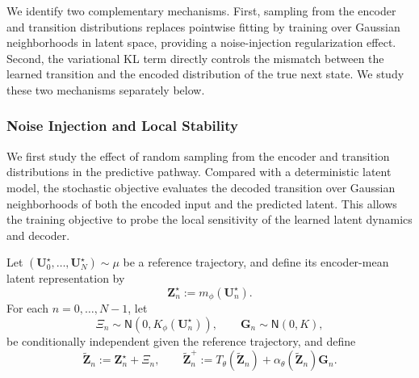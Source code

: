 \documentclass[11pt]{article}
\begin{document}
We identify two complementary mechanisms. First, sampling from the encoder and transition distributions replaces pointwise fitting by training over Gaussian neighborhoods in latent space, providing a noise-injection regularization effect. Second, the variational KL term directly controls the mismatch between the learned transition and the encoded distribution of the true next state. We study these two mechanisms separately below.

\subsubsection{Noise Injection and Local Stability}
\label{subsubsec:noise_injection}

We first study the effect of random sampling from the encoder and transition distributions in the predictive pathway. Compared with a deterministic latent model, the stochastic objective evaluates the decoded transition over Gaussian neighborhoods of both the encoded input and the predicted latent. This allows the training objective to probe the local sensitivity of the learned latent dynamics and decoder.

Let $(\mathbf U_0^\star,\ldots,\mathbf U_N^\star)\sim \mu$ be a reference trajectory, and define its encoder-mean latent representation by
\[
    \mathbf Z_n^\star
    :=
    m_\phi(\mathbf U_n^\star).
\]
For each $n=0,\ldots,N-1$, let
\[
    \Xi_n
    \sim
    \mathsf N(0,K_\phi(\mathbf U_n^\star)),
    \qquad
    \mathbf G_n
    \sim
    \mathsf N(0,K),
\]
be conditionally independent given the reference trajectory, and define
\[
    \widetilde{\mathbf Z}_n
    :=
    \mathbf Z_n^\star+\Xi_n,
    \qquad
    \widetilde{\mathbf Z}_n^+
    :=
    T_\theta(\widetilde{\mathbf Z}_n)
    +
    \alpha_\theta(\widetilde{\mathbf Z}_n)\mathbf G_n.
\]
\end{document}
